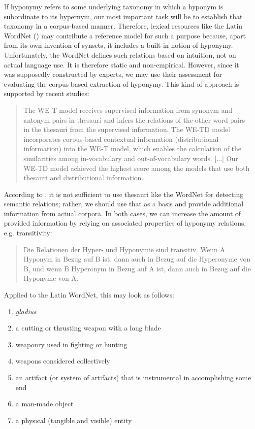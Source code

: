 \documentclass[jou]{apa6} %
\begin{document}
If hyponymy refers to some underlying taxonomy in which a hyponym is subordinate to its hypernym, our most important task will be to establish that taxonomy in a corpus-based manner. Therefore, lexical resources like the Latin WordNet (\cite{minozziLatinWordNetProject2010}) may contribute a reference model for such a purpose because, apart from its own invention of synsets, it includes a built-in notion of hyponymy. Unfortunately, the WordNet defines such relations based on intuition, not on actual language use. It is therefore static and non-empirical. However, since it was supposedly constructed by experts, we may use their assessment for evaluating the corpus-based extraction of hyponymy. This kind of approach is supported by recent studies:
\blockquote[{\cite[p.~984-988]{onoWordEmbeddingbasedAntonym2015}}]{The WE-T model receives supervised information from synonym and antonym pairs in thesauri and infers the relations of the other word pairs in the thesauri from the supervised information. The WE-TD model incorporates corpus-based contextual information (distributional information) into the WE-T model, which enables the calculation of the similarities among in-vocabulary and out-of-vocabulary words. [...] Our WE-TD model achieved the highest score among the models that use both thesauri and distributional information.}
According to \cite{onoWordEmbeddingbasedAntonym2015}, it is not sufficient to use thesauri like the WordNet for detecting semantic relations; rather, we should use that as a basis and provide additional information from actual corpora. In both cases, we can increase the amount of provided information by relying on associated properties of hyponymy relations, e.g. transitivity:
\blockquote[{\cite[p.~58]{coenenAnalogieUndMetapher2013}}]{Die Relationen der Hyper- und Hyponymie sind transitiv. Wenn A Hyponym in Bezug auf B ist, dann auch in Bezug auf die Hyperonyme von B, und wenn B Hyperonym in Bezug auf A ist, dann auch in Bezug auf die Hyponyme von A.}
Applied to the Latin WordNet, this may look as follows:
\begin{enumerate}
         \item \textit{gladius}
         \item a cutting or thrusting weapon with a long blade
         \item weaponry used in fighting or hunting
         \item weapons considered collectively
         \item an artifact (or system of artifacts) that is instrumental in accomplishing some end
         \item a man-made object
         \item a physical (tangible and visible) entity
\end{enumerate}
\end{document}
